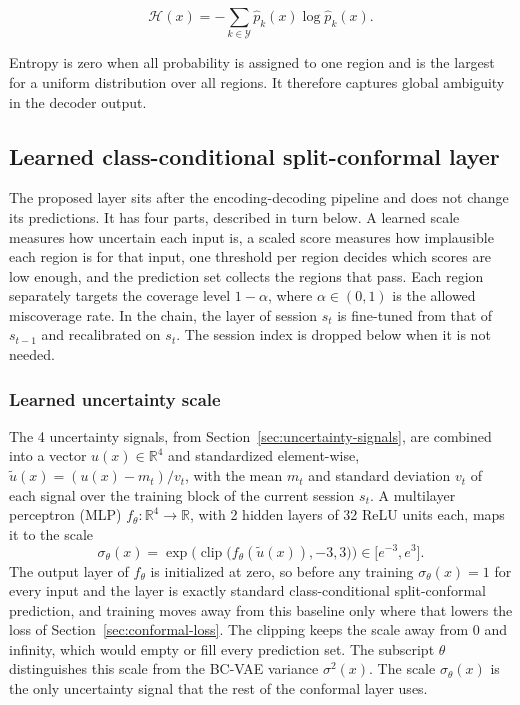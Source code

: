 \documentclass{article}
\begin{document}
\begin{equation}
  \mathcal{H}(x)=-\sum_{k\in\mathcal{Y}}\hat p_k(x)\log \hat p_k(x).
\end{equation}

Entropy is zero when all probability is assigned to one region and is the largest for a uniform distribution over all regions. It therefore captures global ambiguity in the decoder output.

\subsection{Learned class-conditional split-conformal layer}
The proposed layer sits after the encoding-decoding pipeline and does not change its predictions. It has four parts, described in turn below. A learned scale measures how uncertain each input is, a scaled score measures how implausible each region is for that input, one threshold per region decides which scores are low enough, and the prediction set collects the regions that pass. Each region separately targets the coverage level $1-\alpha$, where $\alpha\in(0,1)$ is the allowed miscoverage rate. In the chain, the layer of session $s_t$ is fine-tuned from that of $s_{t-1}$ and recalibrated on $s_t$. The session index is dropped below when it is not needed.

\subsubsection{Learned uncertainty scale}
The 4 uncertainty signals, from Section~\ref{sec:uncertainty-signals}, are combined into a vector $u(x)\in\mathbb{R}^{4}$ and standardized element-wise, $\tilde u(x)=(u(x)-m_t)/v_t$, with the mean $m_t$ and standard deviation $v_t$ of each signal over the training block of the current session $s_t$. A multilayer perceptron (MLP) $f_\theta:\mathbb{R}^4\to\mathbb{R}$, with 2 hidden layers of 32 ReLU units each, maps it to the scale
\begin{equation}
  \sigma_\theta(x)=\exp\!\big(\operatorname{clip}\big(f_\theta(\tilde u(x)),-3,3\big)\big)\in\big[e^{-3},e^{3}\big].
\end{equation}
The output layer of $f_\theta$ is initialized at zero, so before any training $\sigma_\theta(x)=1$ for every input and the layer is exactly standard class-conditional split-conformal prediction, and training moves away from this baseline only where that lowers the loss of Section~\ref{sec:conformal-loss}. The clipping keeps the scale away from 0 and infinity, which would empty or fill every prediction set. The subscript $\theta$ distinguishes this scale from the BC-VAE variance $\sigma^2(x)$. The scale $\sigma_\theta(x)$ is the only uncertainty signal that the rest of the conformal layer uses.
\end{document}
